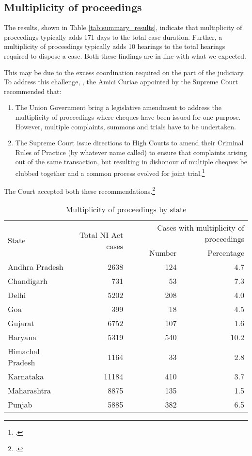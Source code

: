 \subsection{Multiplicity of proceedings}
\label{sec:mult-proc}

The results, shown in Table \ref{tab:summary_results}, indicate that multiplicity of proceedings typically adds 171 days to the total case duration. Further, a multiplicity of proceedings typically adds 10 hearings to the total hearings required to dispose a case. Both these findings are in line with what we expected.

This may be due to the excess coordination required on the part of the judiciary. To address this challenge, , the Amici Curiae appointed by the Supreme Court recommended that:

\begin{enumerate}
 \item The Union Government bring a legislative amendment to address the multiplicity of proceedings where cheques have been issued for one purpose. However, multiple complaints, summons and trials have to be undertaken. 
 \item The Supreme Court issue directions to High Courts to amend their Criminal Rules of Practice (by whatever name called) to ensure that complaints arising out of the same transaction, but resulting in dishonour of multiple cheques be clubbed together and a common process evolved for joint trial.\footcite{amicus2020_submission}
\end{enumerate}

The Court accepted both these recommendations.\footcite{sc2020_138}

\begin{longtable}{@{}lrrr@{}}
 \caption{Multiplicity of proceedings by state}\label{tab:state_multiplicity}\\
\toprule
 \multirow{2}{*}{State} & \multirow{2}{*}{Total NI Act cases} & \multicolumn{2}{p{4cm}}{Cases with multiplicity of proceedings} \\
 \cmidrule{3-4}
 & & Number & Percentage \\
\midrule
\endhead
Andhra Pradesh & 2638 & 124 & 4.7 \\
Chandigarh & 731 & 53 & 7.3 \\
Delhi & 5202 & 208 & 4.0 \\
Goa & 399 & 18 & 4.5 \\
Gujarat & 6752 & 107 & 1.6 \\
Haryana & 5319 & 540 & 10.2 \\
Himachal Pradesh & 1164 & 33 & 2.8 \\
Karnataka & 11184 & 410 & 3.7 \\
Maharashtra & 8875 & 135 & 1.5 \\
Punjab & 5885 & 382 & 6.5 \\
\bottomrule
\end{longtable}

